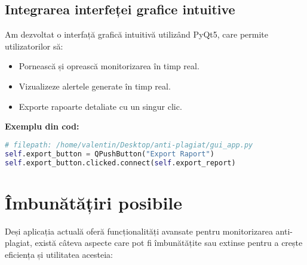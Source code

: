 \documentclass[12pt,a4paper]{article}
\begin{document}
\subsection{Integrarea interfeței grafice intuitive}
Am dezvoltat o interfață grafică intuitivă utilizând PyQt5, care permite utilizatorilor să:
\begin{itemize}
    \item Pornească și oprească monitorizarea în timp real.
    \item Vizualizeze alertele generate în timp real.
    \item Exporte rapoarte detaliate cu un singur clic.
\end{itemize}

\textbf{Exemplu din cod:}
\begin{lstlisting}[language=Python]
# filepath: /home/valentin/Desktop/anti-plagiat/gui_app.py
self.export_button = QPushButton("Export Raport")
self.export_button.clicked.connect(self.export_report)
\end{lstlisting}

\section{Îmbunătățiri posibile}

Deși aplicația actuală oferă funcționalități avansate pentru monitorizarea anti-plagiat, există câteva aspecte care pot fi îmbunătățite sau extinse pentru a crește eficiența și utilitatea acesteia:
\end{document}
